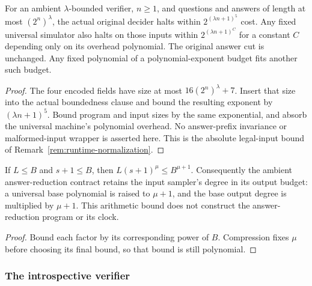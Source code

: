 \begin{lemma}
\label{lem:intro-ambient-runtime}
\leanok
For an ambient $\lambda$-bounded verifier, $n\geq1$, and questions and answers
of length at most $(2^n)^\lambda$, the actual original decider halts within
$2^{(\lambda n+1)^5}$ cost. Any fixed universal simulator also halts on those
inputs within $2^{(\lambda n+1)^C}$ for a constant $C$ depending only on its
overhead polynomial. The original answer cut is unchanged. Any fixed polynomial
of a polynomial-exponent budget fits another such budget.
\end{lemma}
\begin{proof}
\leanok
The four encoded fields have size at most $16(2^n)^\lambda+7$.
Insert that size into the actual boundedness clause and bound the resulting
exponent by $(\lambda n+1)^5$. Bound program and input sizes by the same
exponential, and absorb the universal machine's polynomial overhead. No
answer-prefix invariance or malformed-input wrapper is asserted here. This is the
absolute legal-input bound of Remark~\ref{rem:runtime-normalization}.
\end{proof}

\begin{lemma}
\label{lem:ar-ambient-sampler-cost}
\leanok
If $L\leq B$ and $s+1\leq B$, then $L(s+1)^\mu\leq B^{\mu+1}$.
Consequently the ambient answer-reduction contract retains the input sampler's
degree in its output budget: a universal base polynomial is raised to
$\mu+1$, and the base output degree is multiplied by $\mu+1$. This arithmetic
bound does not construct the answer-reduction program or its clock.
\end{lemma}
\begin{proof}
\leanok
Bound each factor by its corresponding power of $B$. Compression fixes
$\mu$ before choosing its final bound, so that bound is still polynomial.
\end{proof}

\subsubsection{The introspective verifier}

